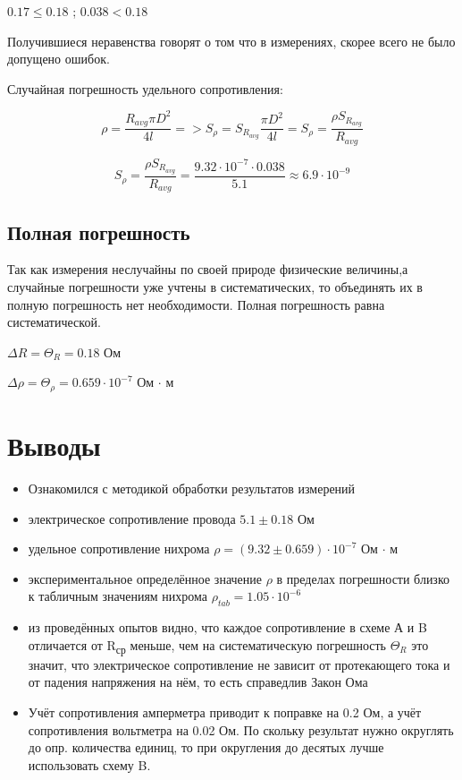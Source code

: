 \documentclass[14pt]{extarticle}
\begin{document}
\(0.17 \leq 0.18\) ;  \(0.038 < 0.18\)

Получившиеся неравенства говорят о том что в измерениях, скорее всего не было
допущено ошибок.


Случайная погрешность удельного сопротивления:

$$ \rho = \frac{R_{avg} \pi D^2}{4l} => S_{\rho} = S_{R_{avg}} \frac{\pi D^2}{4l} = S_{\rho} = \frac{\rho S_{R_{avg}} }{R_{avg}}$$


$$S_{\rho} = \frac{\rho S_{R_{avg}} }{R_{avg}} = \frac{9.32 \cdot 10^{-7} \cdot 0.038}{5.1} \approx 6.9 \cdot 10^{-9}$$
\subsection{Полная погрешность}
\label{sec:orgf8cd4c7}

Так как измерения неслучайны по своей природе
физические величины,а случайные погрешности уже
учтены в систематических, то объединять их в полную погрешность
нет необходимости. Полная погрешность равна систематической.

\(\Delta R = \Theta_R = 0.18\) Ом

\(\Delta \rho = \Theta_{\rho} = 0.659 \cdot 10^{-7}\) Ом \(\cdot\) м
\section{Выводы}
\label{sec:org849ef53}

\begin{itemize}
\item Ознакомился с методикой обработки результатов измерений

\item электрическое сопротивление провода \(5.1 \pm 0.18\) Ом

\item удельное сопротивление нихрома \(\rho = (9.32 \pm 0.659) \cdot 10^{-7}\) Ом \(\cdot\) м

\item экспериментальное определённое значение \(\rho\) в
пределах погрешности близко к табличным значениям нихрома
\(\rho_{tab} = 1.05 \cdot 10^{-6}\)

\item из проведённых опытов видно, что каждое сопротивление в схеме А и B
отличается от R\textsubscript{ср} меньше, чем на систематическую погрешность
\(\Theta_R\) это значит, что электрическое сопротивление не зависит
от протекающего тока и от падения напряжения на нём, то есть
справедлив Закон Ома

\item Учёт сопротивления амперметра приводит к поправке
на 0.2 Ом, а учёт сопротивления вольтметра на 0.02 Ом. По скольку
результат нужно округлять до опр. количества единиц, то при
округления до десятых лучше использовать схему B.
\end{itemize}
\end{document}
